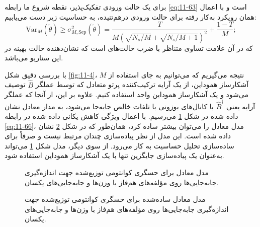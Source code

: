 برای یک حالت ورودی تفکیک‌پذیر، نقطه شروع ما رابطه \eqref{eq:11-63} است و با اعمال همان رویکرد به‌کار رفته برای حالت ورودی درهم‌تنیده، به حساسیت زیر دست می‌یابیم:
\begin{equation}
	\text{Var}_M(\tilde{\theta}) \geq \sigma_{M, \text{Sep}}^2(\tilde{\theta}) = \frac{T}{M(\sqrt{N_s/M} + \sqrt{N_s/M + 1})^2} + \frac{1 - T}{M};
	\label{eq:11-71}
\end{equation}
که در آن علامت تساوی متناظر با ضرب حالت‌های  است که نشان‌دهنده حالت بهینه در این سناریو می‌باشد.

با بررسی دقیق شکل \ref{fig:11-4}، نتیجه می‌گیریم که می‌توانیم به جای استفاده از $M$ آشکارساز هموداین، از یک آرایه ترکیب‌کننده پرتو متعادل که توسط عملگر $\hat{B}$ توصیف می‌شود و یک آشکارساز هموداین واحد استفاده کنیم. علاوه بر این، از آنجا که عملگر آرایه  یعنی $\hat{B}^\dagger$ با کانال‌های بوزونی با تلفات خالص جابه‌جا می‌شود، به مدار معادل نشان داده شده در شکل \ref{fig:11-5} می‌رسیم.
با اعمال ویژگی کاهش یکانی داده شده در رابطه \eqref{eq:11-66}، مدل معادل  را می‌توان بیشتر ساده کرد، همان‌طور که در شکل \ref{fig:11-6} نشان داده شده است. این مدل از نظر پیاده‌سازی چندان مرتبط نیست و صرفاً برای ساده‌سازی تحلیل حساسیت به کار می‌رود. از سوی دیگر، مدل شکل \ref{fig:11-5} می‌تواند به‌عنوان یک پیاده‌سازی جایگزین تنها با یک آشکارساز هموداین استفاده شود.

\begin{figure}[ht]
	\centering
	\caption{مدل معادل برای حسگری کوانتومی توزیع‌شده جهت اندازه‌گیری جابه‌جایی‌ها روی مؤلفه‌های هم‌فاز با وزن‌ها و جابه‌جایی‌های یکسان.}
	\label{fig:11-5}
\end{figure}

\begin{figure}[ht]
	\centering
	\caption{مدل معادل ساده‌شده برای حسگری کوانتومی توزیع‌شده جهت اندازه‌گیری جابه‌جایی‌ها روی مؤلفه‌های هم‌فاز با وزن‌ها و جابه‌جایی‌های یکسان.}
	\label{fig:11-6}
\end{figure}

